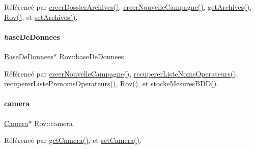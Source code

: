 Référencé par \hyperlink{class_rov_a53f656be57fa1eb7b93e03095a597439}{creer\+Dossier\+Archives()}, \hyperlink{class_rov_ae1306036b067e9ad50a09f9dd607a092}{creer\+Nouvelle\+Campagne()}, \hyperlink{class_rov_af0936fd10d04851d53f28575ecd1da3f}{get\+Archives()}, \hyperlink{class_rov_a5dddd3bd156c134848078296087d090c}{Rov()}, et \hyperlink{class_rov_acb3ecbb04ace455526206d3c05b712fd}{set\+Archives()}.

\mbox{\label{class_rov_a5a9a824cd100947c75d0951eb9e1f90c}} 
\paragraph{\texorpdfstring{base\+De\+Donnees}{baseDeDonnees}}
{\footnotesize\ttfamily \hyperlink{class_base_de_donnees}{Base\+De\+Donnees}$\ast$ Rov\+::base\+De\+Donnees\hspace{0.3cm}{\ttfamily [private]}}



Référencé par \hyperlink{class_rov_ae1306036b067e9ad50a09f9dd607a092}{creer\+Nouvelle\+Campagne()}, \hyperlink{class_rov_a490eefb90bf28e83f181d770f0f52446}{recuperer\+Liste\+Noms\+Operateurs()}, \hyperlink{class_rov_a84dece742f5c4c903ada4f25c869597f}{recuperer\+Liste\+Prenoms\+Operateurs()}, \hyperlink{class_rov_a5dddd3bd156c134848078296087d090c}{Rov()}, et \hyperlink{class_rov_adab08abfde381c2915695489b34da6b4}{stocke\+Mesures\+B\+D\+D()}.

\mbox{\label{class_rov_ad0461ecece812497ee9b4a962f168c18}} 
\paragraph{\texorpdfstring{camera}{camera}}
{\footnotesize\ttfamily \hyperlink{class_camera}{Camera}$\ast$ Rov\+::camera\hspace{0.3cm}{\ttfamily [private]}}



Référencé par \hyperlink{class_rov_aae07e8ca2c4b3be6a0a378b6f072c60b}{get\+Camera()}, et \hyperlink{class_rov_a0eba2119b89406948976ae92781c4629}{set\+Camera()}.

\mbox{\label{class_rov_a8e7aaa17ee2134f26d57241d11ab2a99}} 
